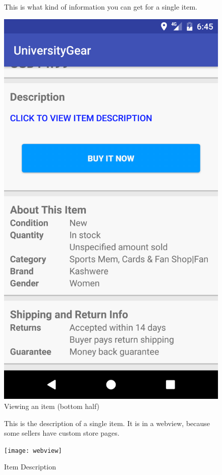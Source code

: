 \documentclass[journal,compsoc, 10pt, draftclsnofoot, onecolumn]{IEEEtran}
\begin{document}
\begin{figure}[!h]
This is what kind of information you can get for a single item.
\centering
\caption{Viewing an item (bottom half)}
\includegraphics[scale=.15]{singleItem2}
\end{figure}
\FloatBarrier

\begin{figure}[!h]
This is the description of a single item. It is in a webview, because some 
sellers have custom store pages.
\centering
\caption{Item Description}
\texttt{[image: webview]}
\end{figure}
\FloatBarrier
\end{document}
